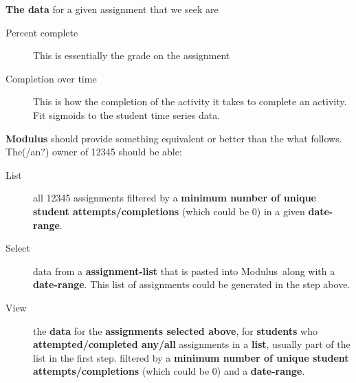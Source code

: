 \documentclass{techbrief}
\newcommand{\modulus}{\textsf{Modulus}}
\begin{document}
\begin{xframe}
    \textbf{The data} for a given assignment that we seek are
    \begin{description}
        \item[Percent complete] This is essentially the grade on the assignment
        \item[Completion over time] This is how the completion of the activity
            it takes to complete an activity. Fit sigmoids to the student time series data.
    \end{description}
\end{xframe}

\begin{xframe}
    \textbf{\modulus} should provide something equivalent or better than the
    what follows. The(/an?) owner of 12345 should be able:
    \begin{description}
        \item[List] all 12345 assignments filtered by a \textbf{minimum number
                of unique student attempts/completions} (which could be 0) in a
            given \textbf{date-range}.
        \item[Select] data from a \textbf{assignment-list} that is pasted into
            \modulus\ along with a \textbf{date-range}. This list of
            assignments could be
            generated in the step above.
        \item[View] the \textbf{data} for the \textbf{assignments selected
                above},
            for \textbf{students} who \textbf{attempted/completed any/all}
            assignments in a
            \textbf{list}, usually part of the list in the first step.
            filtered by a \textbf{minimum number
                of unique student attempts/completions} (which could be 0) and
            a
            \textbf{date-range}.
    \end{description}
\end{xframe}
\end{document}
